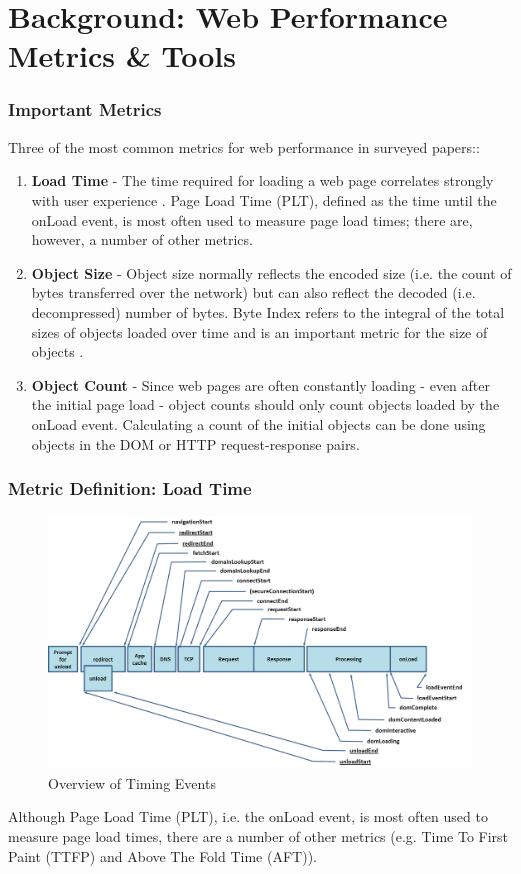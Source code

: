 \section{Background: Web Performance Metrics \& Tools}

\begin{frame}
    \frametitle{Important Metrics}
	Three of the most common metrics for web performance in surveyed papers::
	\begin{enumerate}
	  \item \textbf{Load Time} - The time required for loading a web page correlates strongly with user experience \cite{6263888}. Page Load Time (PLT), defined as the time until the onLoad event, is most often used to measure page load times; there are, however, a number of other metrics.
	  \item \textbf{Object Size} - Object size normally reflects the encoded size (i.e. the count of bytes transferred over the network) but can also reflect the decoded (i.e. decompressed) number of bytes. Byte Index refers to the integral of the total sizes of objects loaded over time and is an important metric for the size of objects \cite{10.1145/2940136.2940138}.
	  \item \textbf{Object Count} - Since web pages are often constantly loading - even after the initial page load - object counts should only count objects loaded by the onLoad event. Calculating a count of the initial objects can be done using objects in the DOM or HTTP request-response pairs.
	\end{enumerate}
\end{frame}

\begin{frame}
    \frametitle{Metric Definition: Load Time}
	\begin{figure}
			\centering
			\includegraphics[width=.7\textwidth,keepaspectratio]{pics/timing-overview.png}
		\caption{Overview of Timing Events \cite{timing_2012}}
		\label{fig:timing_event}
	\end{figure}
Although Page Load Time (PLT), i.e. the onLoad event, is most often used to measure page load times, there are a number of other metrics (e.g. Time To First Paint (TTFP) and Above The Fold Time (AFT)).
	
\end{frame}

